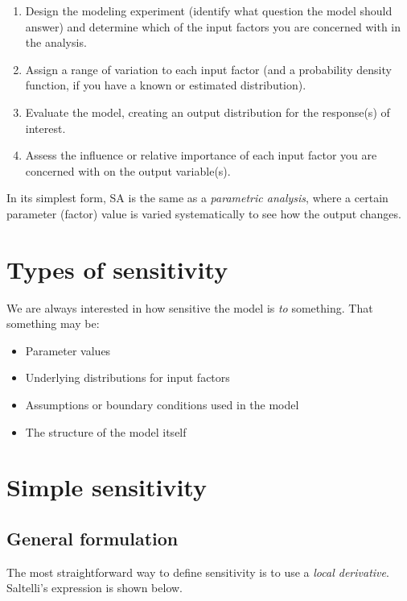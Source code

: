 \documentclass[10pt]{article}
\begin{document}
\begin{enumerate}
    \setlength{\itemsep}{0pt}%
    \setlength{\parskip}{0pt}%
    \item Design the modeling experiment (identify what question the model should answer) and determine which of the input factors you are concerned with in the analysis.
    \item Assign a range of variation to each input factor (and a probability density function, if you have a known or estimated distribution).
    \item Evaluate the model, creating an output distribution for the response(s) of interest.
    \item Assess the influence or relative importance of each input factor you are concerned with on the output variable(s).
\end{enumerate}

In its simplest form, SA is the same as a \textit{parametric analysis}, where a certain parameter (factor) value is varied systematically to see how the output changes.

\section{Types of sensitivity}

We are always interested in how sensitive the model is \textit{to} something. That something may be:

\begin{itemize}
    \setlength{\itemsep}{0pt}%
    \setlength{\parskip}{0pt}%
    \item Parameter values
    \item Underlying distributions for input factors
    \item Assumptions or boundary conditions used in the model
    \item The structure of the model itself
\end{itemize}


\section{Simple sensitivity}

\subsection{General formulation}

The most straightforward way to define sensitivity is to use a \textit{local derivative}. Saltelli's expression \cite{Saltelli2008-zc} is shown below.
\end{document}
